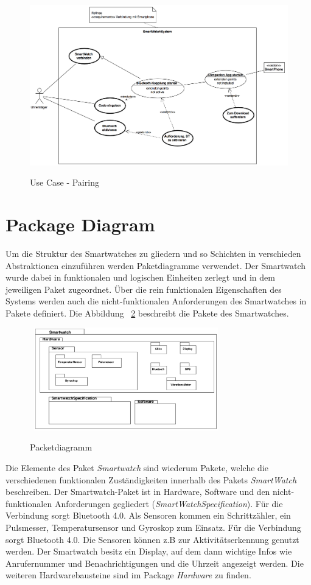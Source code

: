 \begin{figure}[H]
\centering\
\includegraphics[width=14cm]{img/usecase-pairing-p1}
\caption{Use Case - Pairing}\label{fig:usecase-pairing-p1}
\end{figure}



\section{Package Diagram}
Um die Struktur des Smartwatches zu gliedern und so Schichten in verschieden Abstraktionen
einzuführen werden Paketdiagramme verwendet.
Der Smartwatch wurde dabei in funktionalen und logischen Einheiten zerlegt und in dem jeweiligen Paket zugeordnet.
Über die rein funktionalen Eigenschaften des Systems werden auch die nicht-funktionalen Anforderungen des Smartwatches in Pakete definiert.
Die Abbildung ~\ref{fig:package} beschreibt die Pakete des Smartwatches.

\begin{figure}[H]
\centering\
\includegraphics[width=8cm]{img/PackagePhase1}
\caption{Packetdiagramm}\label{fig:package}
\end{figure}

Die Elemente des Paket \textit{Smartwatch} sind wiederum Pakete, welche die verschiedenen funktionalen Zuständigkeiten innerhalb des Pakets \textit{SmartWatch} beschreiben.
Der Smartwatch-Paket ist in Hardware, Software und den nicht-funktionalen Anforderungen
gegliedert (\textit{SmartWatchSpecification}).
Für die Verbindung sorgt Bluetooth 4.0.
Als Sensoren kommen ein Schrittzähler, ein Pulsmesser, Temperatursensor und Gyroskop zum Einsatz. Für die Verbindung sorgt Bluetooth 4.0.
Die Sensoren können z.B zur Aktivitätserkennung genutzt werden.
Der Smartwatch besitz ein Display, auf dem dann wichtige Infos wie Anrufernummer und Benachrichtigungen und die Uhrzeit angezeigt werden.
Die weiteren Hardwarebausteine sind im Package \textit{Hardware} zu finden.

